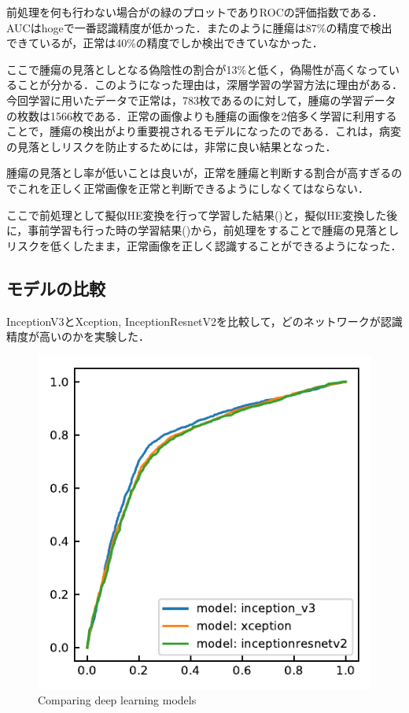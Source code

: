前処理を何も行わない場合がの緑のプロットでありROCの評価指数である．AUCはhogeで一番認識精度が低かった．またのように腫瘍は87\%の精度で検出できているが，正常は40\%の精度でしか検出できていなかった．

ここで腫瘍の見落としとなる偽陰性の割合が13\%と低く，偽陽性が高くなっていることが分かる．このようになった理由は，深層学習の学習方法に理由がある．今回学習に用いたデータで正常は，783枚であるのに対して，腫瘍の学習データの枚数は1566枚である．正常の画像よりも腫瘍の画像を2倍多く学習に利用することで，腫瘍の検出がより重要視されるモデルになったのである．これは，病変の見落としリスクを防止するためには，非常に良い結果となった．

腫瘍の見落とし率が低いことは良いが，正常を腫瘍と判断する割合が高すぎるのでこれを正しく正常画像を正常と判断できるようにしなくてはならない．

ここで前処理として擬似HE変換を行って学習した結果()と，擬似HE変換した後に，事前学習も行った時の学習結果()から，前処理をすることで腫瘍の見落としリスクを低くしたまま，正常画像を正しく認識することができるようになった．

\subsection*{モデルの比較}
InceptionV3とXception, InceptionResnetV2を比較して，どのネットワークが認識精度が高いのかを実験した．

\begin{figure}[H]
	\centering
	\includegraphics[width=0.7\linewidth]{fig/chapter4/2dcnn_model}
	\caption{Comparing deep learning models}
	\label{fig:2dcnnmodel}
\end{figure}

